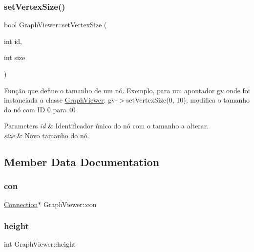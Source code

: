 \subsubsection{\texorpdfstring{set\+Vertex\+Size()}{setVertexSize()}}
{\footnotesize\ttfamily bool Graph\+Viewer\+::set\+Vertex\+Size (\begin{DoxyParamCaption}\item[{int}]{id,  }\item[{int}]{size }\end{DoxyParamCaption})}

Função que define o tamanho de um nó. Exemplo, para um apontador gv onde foi instanciada a classe \mbox{\hyperlink{class_graph_viewer}{Graph\+Viewer}}\+: gv-\/$>$set\+Vertex\+Size(0, 10); modifica o tamanho do nó com ID 0 para 40


\begin{DoxyParams}{Parameters}
{\em id} & Identificador único do nó com o tamanho a alterar. \\
\hline
{\em size} & Novo tamanho do nó. \\
\hline
\end{DoxyParams}


\subsection{Member Data Documentation}
\mbox{\label{class_graph_viewer_a14a206f78c242e739e0908b06070ba4d}} 
\subsubsection{\texorpdfstring{con}{con}}
{\footnotesize\ttfamily \mbox{\hyperlink{class_connection}{Connection}}$\ast$ Graph\+Viewer\+::con\hspace{0.3cm}{\ttfamily [private]}}

\mbox{\label{class_graph_viewer_a9a1000e492a66ac4301c7135275690da}} 
\subsubsection{\texorpdfstring{height}{height}}
{\footnotesize\ttfamily int Graph\+Viewer\+::height\hspace{0.3cm}{\ttfamily [private]}}

